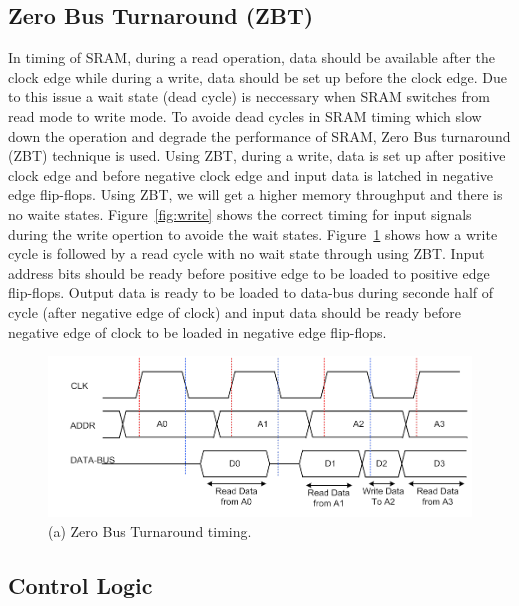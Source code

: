 \subsection{Zero Bus Turnaround (ZBT)}
\label{sec:ZBT}

In timing of SRAM, during a read operation, data should be available after the clock edge while 
during a write, data should be set up before the clock edge. Due to this issue a wait state (dead cycle) is neccessary when SRAM switches 
from read mode to write mode. 
To avoide dead cycles in SRAM timing which slow down the operation and degrade the performance of SRAM, Zero Bus turnaround (ZBT) technique is used.
Using ZBT, during a write, data is set up after positive clock edge and before negative clock edge and input data is latched in negative edge flip-flops. 
Using ZBT, we will get a higher memory throughput and there is no waite states.
Figure~\ref{fig:write} shows the correct timing for input signals during the write opertion to avoide the wait states. 
Figure~\ref{fig:ZBT} shows how a write cycle is followed by a read cycle with no wait state through using ZBT.
Input address bits should be ready before positive edge to be loaded to positive edge flip-flops. Output data is ready to be loaded to data-bus during seconde half of cycle (after negative edge of clock) and 
input data should be ready before negative edge of clock to be loaded in negative edge  flip-flops.

\begin{figure}[h!]
\centering
\includegraphics[scale=0.9]{./figs/ZBT.pdf}
\caption{(a) Zero Bus Turnaround timing.}
\label{fig:ZBT}
\end{figure}


\subsection{Control Logic}
\label{sec:control}




